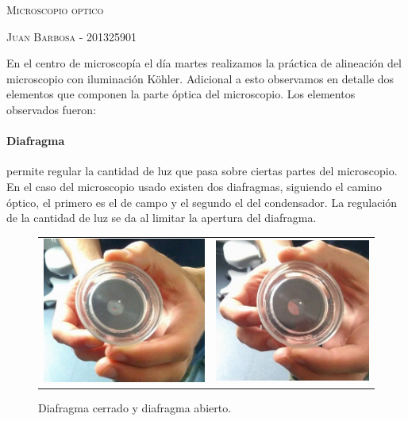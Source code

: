\documentclass[addpoints,10pt]{exam}
\begin{document}
	\begin{center}
		\LARGE\scshape{Microscopio optico}
		
		\vspace{1cm}
		\large\scshape{Juan Barbosa - 201325901}
	\end{center}

	En el centro de microscop\'ia el d\'ia martes realizamos la pr\'actica de alineaci\'on del microscopio con iluminaci\'on K\"ohler. Adicional a esto observamos en detalle dos elementos que componen la parte \'optica del microscopio. Los elementos observados fueron:
	
	\paragraph{Diafragma}
	permite regular la cantidad de luz que pasa sobre ciertas partes del microscopio. En el caso del microscopio usado existen dos diafragmas, siguiendo el camino \'optico, el primero es el de campo y el segundo el del condensador. La regulaci\'on de la cantidad de luz se da al limitar la apertura del diafragma.
	\begin{figure}[h]
		\centering
		\begin{tabular}{cc}
			\includegraphics[width = 0.3\linewidth]{diafragma1.jpg} & \includegraphics[width = 0.3\linewidth]{diafragma2.jpg}\\
		\end{tabular}
		\caption{Diafragma cerrado y diafragma abierto.}
	\end{figure}
	
\end{document}
